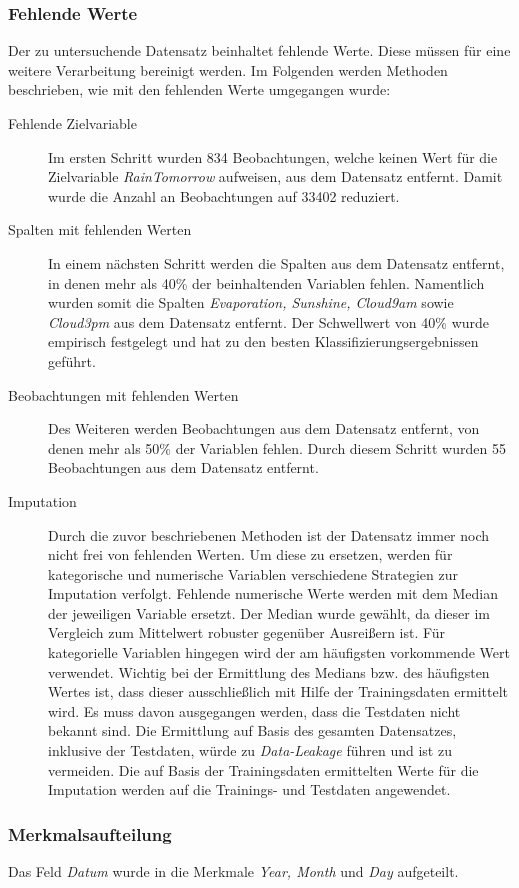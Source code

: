 \subsubsection{Fehlende Werte}
Der zu untersuchende Datensatz beinhaltet fehlende Werte. Diese müssen für eine weitere Verarbeitung bereinigt werden. Im Folgenden werden Methoden beschrieben, wie mit den fehlenden Werte umgegangen wurde:
\begin{description}
	\item[Fehlende Zielvariable]
	 Im ersten Schritt wurden 834 Beobachtungen, welche keinen Wert für die Zielvariable \emph{RainTomorrow} aufweisen, aus dem Datensatz entfernt. Damit wurde die Anzahl an Beobachtungen auf 33402 reduziert.
	 \item[Spalten mit fehlenden Werten]
	 In einem nächsten Schritt werden die Spalten aus dem Datensatz entfernt, in denen mehr als 40\% der beinhaltenden Variablen fehlen. Namentlich wurden somit die Spalten \emph{Evaporation, Sunshine, Cloud9am} sowie \emph{Cloud3pm} aus dem Datensatz entfernt. Der Schwellwert von 40\% wurde empirisch festgelegt und hat zu den besten Klassifizierungsergebnissen geführt.
	 \item[Beobachtungen mit fehlenden Werten]
	 Des Weiteren werden Beobachtungen aus dem Datensatz entfernt, von denen mehr als 50\% der Variablen fehlen. Durch diesem Schritt wurden 55 Beobachtungen aus dem Datensatz entfernt.
	 \item[Imputation]
	 Durch die zuvor beschriebenen Methoden ist der Datensatz immer noch  nicht frei von fehlenden Werten. Um diese zu ersetzen, werden für kategorische und numerische Variablen verschiedene Strategien zur Imputation verfolgt. Fehlende numerische Werte werden mit dem Median der jeweiligen Variable ersetzt. Der Median wurde gewählt, da dieser im Vergleich zum Mittelwert robuster gegenüber Ausreißern ist. Für kategorielle Variablen hingegen wird der am häufigsten vorkommende Wert verwendet. Wichtig bei der Ermittlung des Medians bzw. des häufigsten Wertes ist, dass dieser ausschließlich mit Hilfe der Trainingsdaten ermittelt wird. Es muss davon ausgegangen werden, dass die Testdaten nicht bekannt sind. Die Ermittlung auf Basis des gesamten Datensatzes, inklusive der Testdaten, würde zu \emph{Data-Leakage} führen und ist zu vermeiden. Die auf Basis der Trainingsdaten ermittelten Werte für die Imputation werden auf die Trainings- und Testdaten angewendet.
\end{description}

\subsubsection{Merkmalsaufteilung}
Das Feld \emph{Datum} wurde in die Merkmale \emph{Year, Month} und \emph{Day} aufgeteilt.

